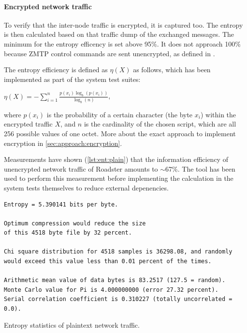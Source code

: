 \paragraph{Encrypted network traffic}
To verify that the inter-node traffic is encrypted, it is captured too. The entropy is then calculated
based on that traffic dump of the exchanged messages. The minimum for the entropy efficency is set
above 95\%. It does not approach 100\% because \gls{ZMTP} control
commands are sent unencrypted, as defined in \cite[High-level
Grammar]{zmq:curvezmq}.

The entropy efficiency is defined as $\eta(X)$ as follows, which has been
implemented as part of the system test suites:

\begin{center}
$\eta(X) = -\sum_{i=1}^n \frac{p(x_i) \log_b (p(x_i))}{\log_b (n)}$,
\end{center}

where $p(x_i)$ is the probability of a certain character (the byte $x_i$)
within the encrypted traffic $X$, and $n$ is the cardinality of the chosen
script, which are all 256 possible values of one octet. More about the exact
approach to implement encryption in \autoref{sec:approach:encryption}.

Measurements have shown (\autoref{lst:ent:plain}) that the information
efficiency of unencrypted network traffic of Roadster amounts to $\sim$67\%.
The  tool has been used to perform this measurement before implementing
the calculation in the system tests themselves to reduce external depenencies.

\begin{listing}
	\begin{verbatim}
Entropy = 5.390141 bits per byte.

Optimum compression would reduce the size
of this 4518 byte file by 32 percent.

Chi square distribution for 4518 samples is 36298.08, and randomly
would exceed this value less than 0.01 percent of the times.

Arithmetic mean value of data bytes is 83.2517 (127.5 = random).
Monte Carlo value for Pi is 4.000000000 (error 27.32 percent).
Serial correlation coefficient is 0.310227 (totally uncorrelated = 0.0).
	\end{verbatim}
	\caption{Entropy statistics of plaintext network traffic.}
	\label{lst:ent:plain}
\end{listing}



